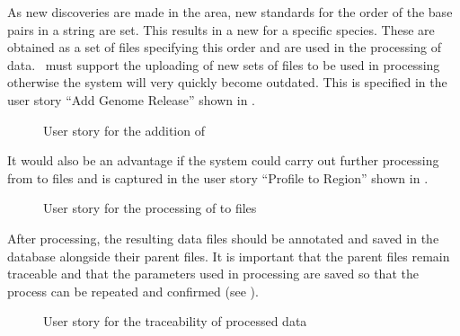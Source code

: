 As new discoveries are made in the area, new standards for the order of the base pairs in a  string are set. This results in a new  for a specific species. These are obtained as a set of files specifying this order and are used in the processing of  data. \appName\ must support the uploading of new sets of  files to be used in processing otherwise the system will very quickly become outdated. This is specified in the user story ``Add Genome Release'' shown in .

\begin{figure}[h]
\caption{User story for the addition of }
\label{fig:target_GR}
\end{figure}

It would also be an advantage if the system could carry out further processing from  to  files and is captured in the user story ``Profile to Region'' shown in .

\begin{figure}[h]
\caption{User story for the processing of  to  files}
\label{fig:target_profReg}
\end{figure}

After processing, the resulting data files should be annotated and saved in the database alongside their parent files. It is important that the parent files remain traceable and that the parameters used in processing are saved so that the process can be repeated and confirmed (see ).

\begin{figure}[h]
\caption{User story for the traceability of processed data}
\label{fig:target_trace}
\end{figure}

